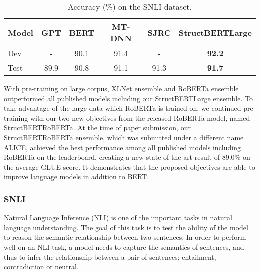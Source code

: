 \documentclass{article}
\begin{document}
\begin{table}[b]
\begin{center}
\begin{tabular}{l|c|c|c|c|c}
\hline \bf Model & \bf GPT & \bf BERT & \bf MT-DNN & \bf SJRC & \bf StructBERT{\small Large}\\
\hline
Dev & - & 90.1 & 91.4 & - & {\bf 92.2} \\
Test & 89.9 & 90.8 & 91.1 & 91.3 & {\bf 91.7} \\
\hline
\end{tabular}
\end{center}
\caption{Accuracy (\%) on the SNLI dataset. }
\label{table:snli}
\end{table}

With pre-training on large corpus, XLNet ensemble and RoBERTa ensemble outperformed all published models including our StructBERT{\small Large} ensemble. To take advantage of the large data which RoBERTa is trained on, we continued pre-training with our two new objectives from the released RoBERTa model, named StructBERT{\small RoBERTa}. At the time of paper submission, our StructBERT{\small RoBERTa} ensemble, which was submitted under a different name ALICE, achieved the best performance among all published models including RoBERTa on the leaderboard, creating a new state-of-the-art result of 89.0\% on the average GLUE score. It demonstrates that the proposed objectives are able to improve language models in addition to BERT.

\subsubsection{SNLI}
Natural Language Inference (NLI) is one of the important tasks in natural language understanding. The goal of this task is to test the ability of the model to reason the semantic relationship between two sentences. In order to perform well on an NLI task, a model needs to capture the semantics of sentences, and thus to infer the relationship between a pair of sentences: entailment, contradiction or neutral.
\end{document}
